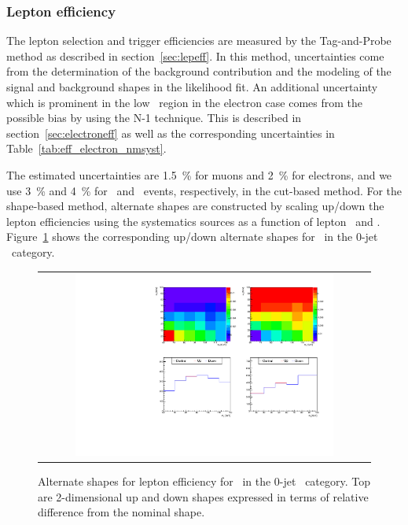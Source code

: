 \subsubsection{Lepton efficiency} 

The lepton selection and trigger efficiencies are measured by the Tag-and-Probe method
as described in section~\ref{sec:lepeff}. In this method, uncertainties come from 
the determination of the background contribution and the modeling of the signal 
and background shapes in the likelihood fit. An additional uncertainty which is 
prominent in the low \pt\ region in the electron case 
comes from the possible bias by using the N-1 technique. 
This is described in section~\ref{sec:electroneff} as well as the corresponding 
uncertainties in Table~\ref{tab:eff_electron_nmsyst}.

The estimated uncertainties are 1.5~\% for muons and 2~\% for electrons, 
and we use 3~\% and 4~\% for \mumu\ and \ee\ events, respectively, 
in the cut-based method. 
For the shape-based method, alternate shapes are constructed by
scaling up/down the lepton efficiencies using the systematics sources
as a function of lepton \pt\ and \Eta.
Figure~\ref{fig:alter_lepeff} shows the corresponding up/down alternate shapes
for \qqww\ in the 0-jet \DF\ category. 

%
\begin{figure}[htp]
\centering
\begin{tabular}{c}
\includegraphics[width=0.8\textwidth]{figures/histo_qqWW_CMS_hww_MVALepEffBounding_0j_zoom.pdf}
\end{tabular}
\caption{Alternate shapes for lepton efficiency for \qqww\ in the 0-jet \DF\ category. 
         Top are 2-dimensional up and down shapes expressed in terms of relative 
         difference from the nominal shape.}
\label{fig:alter_lepeff}
\end{figure}



